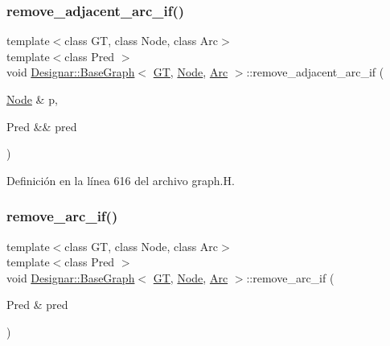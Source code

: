 \subsubsection{\texorpdfstring{remove\+\_\+adjacent\+\_\+arc\+\_\+if()}{remove\_adjacent\_arc\_if()}\hspace{0.1cm}{\footnotesize\ttfamily [2/2]}}
{\footnotesize\ttfamily template$<$class GT, class Node, class Arc$>$ \\
template$<$class Pred $>$ \\
void \hyperlink{class_designar_1_1_base_graph}{Designar\+::\+Base\+Graph}$<$ \hyperlink{demo-buildgraph_8_c_a3001c40d2c31ca87ed96cd7d1334a55e}{GT}, \hyperlink{namespace_designar_a5af326c65aa2bd26b26c410f2030d09e}{Node}, \hyperlink{namespace_designar_a3f55fb5513d62ff47cbc8f72b8e95d6f}{Arc} $>$\+::remove\+\_\+adjacent\+\_\+arc\+\_\+if (\begin{DoxyParamCaption}\item[{\hyperlink{namespace_designar_a5af326c65aa2bd26b26c410f2030d09e}{Node} \&}]{p,  }\item[{Pred \&\&}]{pred }\end{DoxyParamCaption})\hspace{0.3cm}{\ttfamily [inline]}}



Definición en la línea 616 del archivo graph.\+H.

\mbox{\label{class_designar_1_1_base_graph_a9c97f2759a2847e61e17dc2806172758}} 
\subsubsection{\texorpdfstring{remove\+\_\+arc\+\_\+if()}{remove\_arc\_if()}\hspace{0.1cm}{\footnotesize\ttfamily [1/2]}}
{\footnotesize\ttfamily template$<$class GT, class Node, class Arc$>$ \\
template$<$class Pred $>$ \\
void \hyperlink{class_designar_1_1_base_graph}{Designar\+::\+Base\+Graph}$<$ \hyperlink{demo-buildgraph_8_c_a3001c40d2c31ca87ed96cd7d1334a55e}{GT}, \hyperlink{namespace_designar_a5af326c65aa2bd26b26c410f2030d09e}{Node}, \hyperlink{namespace_designar_a3f55fb5513d62ff47cbc8f72b8e95d6f}{Arc} $>$\+::remove\+\_\+arc\+\_\+if (\begin{DoxyParamCaption}\item[{Pred \&}]{pred }\end{DoxyParamCaption})\hspace{0.3cm}{\ttfamily [inline]}}



